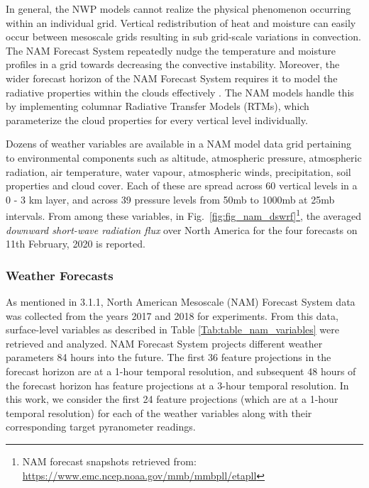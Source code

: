 \par In general, the NWP models cannot realize the  physical phenomenon occurring within an individual grid. Vertical redistribution of heat and moisture can easily occur between mesoscale grids resulting in sub grid-scale variations in convection. The NAM Forecast System repeatedly nudge the temperature and moisture profiles in a grid towards decreasing the convective instability. Moreover, the wider forecast horizon of the NAM Forecast System requires it to model the radiative properties within the clouds effectively \cite{multimodel_rtm}. The NAM models handle this by implementing columnar Radiative Transfer Models (RTMs), which parameterize the cloud properties for every vertical level individually.

\par Dozens of weather variables are available in a NAM model data grid pertaining to environmental components such as altitude, atmospheric pressure, atmospheric radiation, air temperature, water vapour, atmospheric winds, precipitation, soil properties and cloud cover. Each of these are spread across 60 vertical levels in a 0 - 3 km layer, and across 39 pressure levels from 50mb to 1000mb at 25mb intervals. From among these variables, in Fig.~\ref{fig:fig_nam_dswrf}\footnote{NAM forecast snapshots retrieved from: \url{https://www.emc.ncep.noaa.gov/mmb/mmbpll/etapll}}, the averaged \textit{downward short-wave radiation flux} over North America for the four forecasts on 11th February, 2020 is reported.

\subsubsection*{Weather Forecasts}
\par As mentioned in 3.1.1, North American Mesoscale (NAM) Forecast System data was collected from the years 2017 and 2018 for experiments. From this data, surface-level variables as described in Table \ref{Tab:table_nam_variables} were retrieved and analyzed. NAM Forecast System projects different weather parameters 84 hours into the future. The first 36 feature projections in the forecast horizon are at a 1-hour temporal resolution, and subsequent 48 hours of the forecast horizon has feature projections at a 3-hour temporal resolution. In this work, we consider the first 24 feature projections (which are at a 1-hour temporal resolution) for each of the weather variables along with their corresponding target pyranometer readings. 

